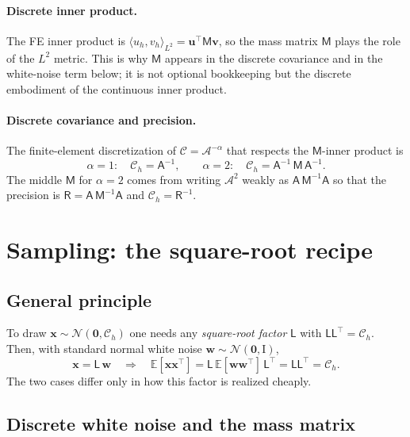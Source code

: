 \documentclass[11pt]{article}
\theoremstyle{definition}
\theoremstyle{plain}
\theoremstyle{remark}
\newcommand{\E}{\mathbb{E}}
\newcommand{\Nc}{\mathcal{N}}
\newcommand{\Cc}{\mathcal{C}}
\newcommand{\Ac}{\mathcal{A}}
\newcommand{\inner}[2]{\langle #1, #2 \rangle}
\newcommand{\Mmat}{\mathsf{M}}
\newcommand{\Amat}{\mathsf{A}}
\newcommand{\Rmat}{\mathsf{R}}
\newcommand{\Lmat}{\mathsf{L}}
\newcommand{\bx}{\bm{x}}
\newcommand{\bw}{\bm{w}}
\begin{document}
\paragraph{Discrete inner product.}
The FE inner product is $\inner{u_h}{v_h}_{L^2} = \bm{u}^\top \Mmat \bm{v}$, so
the mass matrix $\Mmat$ plays the role of the $L^2$ metric. This is why $\Mmat$
appears in the discrete covariance and in the white-noise term below; it is not
optional bookkeeping but the discrete embodiment of the continuous inner
product.

\paragraph{Discrete covariance and precision.}
The finite-element discretization of $\Cc=\Ac^{-\alpha}$ that respects the
$\Mmat$-inner product is
\begin{equation}
  \boxed{\;
  \alpha=1:\quad \Cc_h = \Amat^{-1}, \qquad
  \alpha=2:\quad \Cc_h = \Amat^{-1}\,\Mmat\,\Amat^{-1}. \;}
  \label{eq:disc-cov}
\end{equation}
The middle $\Mmat$ for $\alpha=2$ comes from writing $\Ac^2$ weakly as
$\Amat\,\Mmat^{-1}\Amat$ so that the precision is
$\Rmat = \Amat\,\Mmat^{-1}\Amat$ and $\Cc_h = \Rmat^{-1}$.

\section{Sampling: the square-root recipe}

\subsection{General principle}

To draw $\bx \sim \Nc(\bm 0, \Cc_h)$ one needs any \emph{square-root factor}
$\Lmat$ with $\Lmat\Lmat^\top = \Cc_h$. Then, with standard normal white noise
$\bw \sim \Nc(\bm 0, \mathrm{I})$,
\begin{equation}
  \bx = \Lmat\,\bw
  \quad\Longrightarrow\quad
  \E[\bx\bx^\top] = \Lmat\,\E[\bw\bw^\top]\,\Lmat^\top = \Lmat\Lmat^\top
    = \Cc_h .
  \label{eq:sqrt}
\end{equation}
The two cases differ only in how this factor is realized cheaply.

\subsection{Discrete white noise and the mass matrix}
\end{document}
